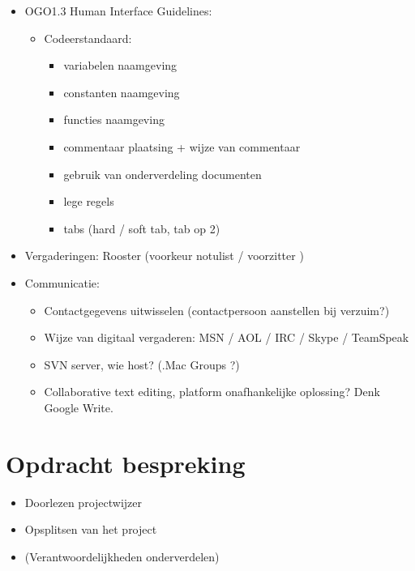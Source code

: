 \documentclass[]{article}
\begin{document}
\begin{itemize}
    \item OGO1.3 Human Interface Guidelines:
        \begin{itemize}
            \item Codeerstandaard:
                \begin{itemize}
                    \item variabelen naamgeving
                    \item constanten naamgeving
                    \item functies naamgeving
                    \item commentaar plaatsing + wijze van commentaar
                    \item gebruik van onderverdeling documenten
                    \item lege regels
                    \item tabs (hard / soft tab, tab op 2)
                \end{itemize}
        \end{itemize}

    \item Vergaderingen: Rooster (voorkeur notulist / voorzitter )

    \item Communicatie:
        \begin{itemize}
            \item Contactgegevens uitwisselen (contactpersoon aanstellen bij verzuim?)
            \item Wijze van digitaal vergaderen: MSN / AOL / IRC / Skype / TeamSpeak
            \item SVN server, wie host? (.Mac Groups ?)
            \item Collaborative text editing, platform onafhankelijke oplossing? Denk Google Write.
        \end{itemize}

\end{itemize}


\section{Opdracht bespreking}

  \begin{itemize}
    \item Doorlezen projectwijzer
    \item Opsplitsen van het project
    \item (Verantwoordelijkheden onderverdelen)
  \end{itemize}
\end{document}
